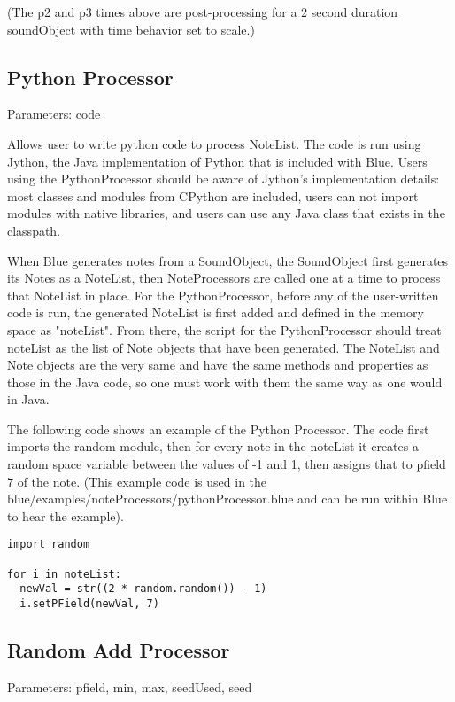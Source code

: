 (The p2 and p3 times above are post-processing for a 2 second duration
soundObject with time behavior set to scale.)


\subsection{Python Processor}\label{pythonProcessor}

Parameters: code

Allows user to write python code to process NoteList. The code is run
using Jython, the Java implementation of Python that is included with
Blue. Users using the PythonProcessor should be aware of Jython's
implementation details: most classes and modules from CPython are
included, users can not import modules with native libraries, and users
can use any Java class that exists in the classpath.

When Blue generates notes from a SoundObject, the SoundObject first
generates its Notes as a NoteList, then NoteProcessors are called one at
a time to process that NoteList in place. For the PythonProcessor,
before any of the user-written code is run, the generated NoteList is
first added and defined in the memory space as "noteList". From there,
the script for the PythonProcessor should treat noteList as the list of
Note objects that have been generated. The NoteList and Note objects are
the very same and have the same methods and properties as those in the
Java code, so one must work with them the same way as one would in Java.

The following code shows an example of the Python Processor. The code
first imports the random module, then for every note in the noteList it
creates a random space variable between the values of -1 and 1, then
assigns that to pfield 7 of the note. (This example code is used in the
blue/examples/noteProcessors/pythonProcessor.blue and can be run within
Blue to hear the example).

\begin{verbatim}
import random

for i in noteList:
  newVal = str((2 * random.random()) - 1)
  i.setPField(newVal, 7)
\end{verbatim}


\subsection{Random Add Processor}\label{randomAddProcessor}

Parameters: pfield, min, max, seedUsed, seed

